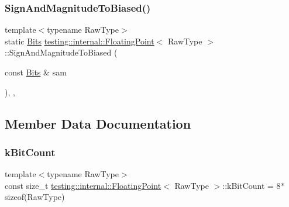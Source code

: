 \subsubsection{\texorpdfstring{Sign\+And\+Magnitude\+To\+Biased()}{SignAndMagnitudeToBiased()}}
{\footnotesize\ttfamily template$<$typename Raw\+Type$>$ \\
static \hyperlink{classtesting_1_1internal_1_1FloatingPoint_abf228bf6cd48f12c8b44c85b4971a731}{Bits} \hyperlink{classtesting_1_1internal_1_1FloatingPoint}{testing\+::internal\+::\+Floating\+Point}$<$ Raw\+Type $>$\+::Sign\+And\+Magnitude\+To\+Biased (\begin{DoxyParamCaption}\item[{const \hyperlink{classtesting_1_1internal_1_1FloatingPoint_abf228bf6cd48f12c8b44c85b4971a731}{Bits} \&}]{sam }\end{DoxyParamCaption})\hspace{0.3cm}{\ttfamily [inline]}, {\ttfamily [static]}, {\ttfamily [private]}}



\subsection{Member Data Documentation}
\mbox{\label{classtesting_1_1internal_1_1FloatingPoint_ab819d2e8f93e9e482373999f0f8d71b9}} 
\subsubsection{\texorpdfstring{k\+Bit\+Count}{kBitCount}}
{\footnotesize\ttfamily template$<$typename Raw\+Type$>$ \\
const size\+\_\+t \hyperlink{classtesting_1_1internal_1_1FloatingPoint}{testing\+::internal\+::\+Floating\+Point}$<$ Raw\+Type $>$\+::k\+Bit\+Count = 8$\ast$sizeof(Raw\+Type)\hspace{0.3cm}{\ttfamily [static]}}

\mbox{\label{classtesting_1_1internal_1_1FloatingPoint_a1973d843c00781053d3073daa8a40119}} 
